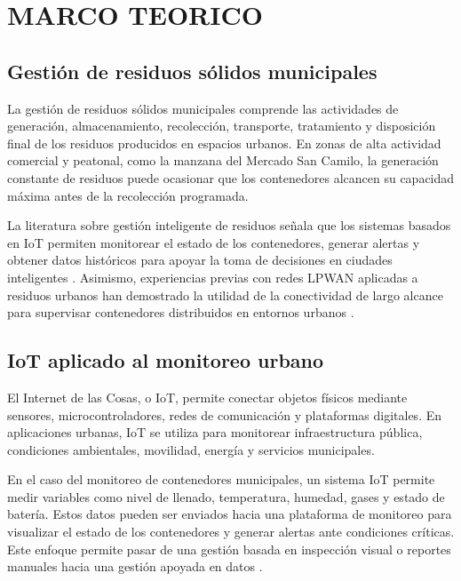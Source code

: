 \chapter{MARCO TEORICO}

\section{Gestión de residuos sólidos municipales}

La gestión de residuos sólidos municipales comprende las actividades de generación, almacenamiento, recolección, transporte, tratamiento y disposición final de los residuos producidos en espacios urbanos. En zonas de alta actividad comercial y peatonal, como la manzana del Mercado San Camilo, la generación constante de residuos puede ocasionar que los contenedores alcancen su capacidad máxima antes de la recolección programada.

La literatura sobre gestión inteligente de residuos señala que los sistemas basados en IoT permiten monitorear el estado de los contenedores, generar alertas y obtener datos históricos para apoyar la toma de decisiones en ciudades inteligentes \cite{sosunova2022smartwaste}. Asimismo, experiencias previas con redes LPWAN aplicadas a residuos urbanos han demostrado la utilidad de la conectividad de largo alcance para supervisar contenedores distribuidos en entornos urbanos \cite{cruz2021lorawanwaste}.

\section{IoT aplicado al monitoreo urbano}

El Internet de las Cosas, o IoT, permite conectar objetos físicos mediante sensores, microcontroladores, redes de comunicación y plataformas digitales. En aplicaciones urbanas, IoT se utiliza para monitorear infraestructura pública, condiciones ambientales, movilidad, energía y servicios municipales.

En el caso del monitoreo de contenedores municipales, un sistema IoT permite medir variables como nivel de llenado, temperatura, humedad, gases y estado de batería. Estos datos pueden ser enviados hacia una plataforma de monitoreo para visualizar el estado de los contenedores y generar alertas ante condiciones críticas. Este enfoque permite pasar de una gestión basada en inspección visual o reportes manuales hacia una gestión apoyada en datos \cite{sosunova2022smartwaste,baldo2021multilayer}.

